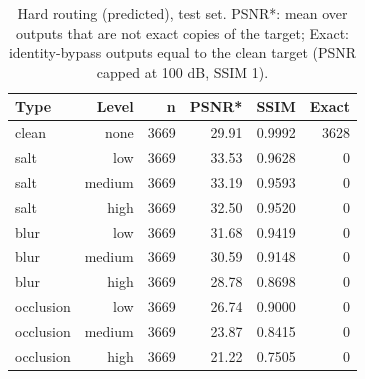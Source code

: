 \begin{table}[t]
\centering
\caption{Hard routing (predicted), test set. PSNR*: mean over outputs that are not exact copies of the target; Exact: identity-bypass outputs equal to the clean target (PSNR capped at 100 dB, SSIM 1).}
\label{tab:t2_routing_predicted_by_type_level}
\begin{tabular}{lrrrrr}
\toprule
Type & Level & n & PSNR* & SSIM & Exact \\
\midrule
clean & none & 3669 & 29.91 & 0.9992 & 3628 \\
salt & low & 3669 & 33.53 & 0.9628 & 0 \\
salt & medium & 3669 & 33.19 & 0.9593 & 0 \\
salt & high & 3669 & 32.50 & 0.9520 & 0 \\
blur & low & 3669 & 31.68 & 0.9419 & 0 \\
blur & medium & 3669 & 30.59 & 0.9148 & 0 \\
blur & high & 3669 & 28.78 & 0.8698 & 0 \\
occlusion & low & 3669 & 26.74 & 0.9000 & 0 \\
occlusion & medium & 3669 & 23.87 & 0.8415 & 0 \\
occlusion & high & 3669 & 21.22 & 0.7505 & 0 \\
\bottomrule
\end{tabular}
\end{table}
